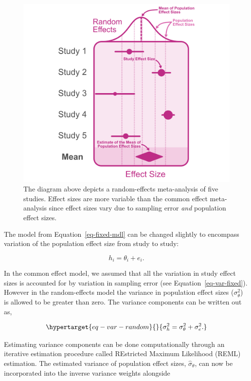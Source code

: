 \documentclass[
  letterpaper,
  DIV=11,
  numbers=noendperiod]{scrreprt}
\begin{document}
\begin{figure}[H]

{\centering \includegraphics{figure/random_effects_diagram.png}

}

\caption{\label{fig-random-effects}The diagram above depicts a
random-effects meta-analysis of five studies. Effect sizes are more
variable than the common effect meta-analysis since effect sizes vary
due to sampling error \emph{and} population effect sizes.}

\end{figure}

The model from Equation~\ref{eq-fixed-mdl} can be changed slightly to
encompass variation of the population effect size from study to study:

\[
h_i = \theta_i + e_i.
\]

In the common effect model, we assumed that all the variation in study
effect sizes is accounted for by variation in sampling error (see
Equation~\ref{eq-var-fixed}). However in the random-effects model the
variance in population effect sizes (\(\sigma^2_\theta\)) is allowed to
be greater than zero. The variance components can be written out as,

\begin{equation}\protect\hypertarget{eq-var-random}{}{
\sigma^2_h=\sigma^2_\theta + \sigma^2_e.
}\label{eq-var-random}\end{equation}

Estimating variance components can be done computationally through an
iterative estimation procedure called REstricted Maximum Likelihood
(REML) estimation. The estimated variance of population effect sizes,
\(\hat{\sigma}_\theta\), can now be incorporated into the inverse
variance weights alongside
\end{document}
